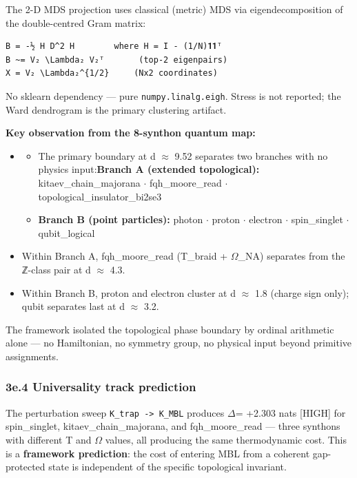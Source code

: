 \documentclass[12pt,a4paper]{article}
\begin{document}
The 2-D MDS projection uses classical (metric) MDS via eigendecomposition of the double-centred Gram matrix:

\begin{lstlisting}
B = -½ H D^2 H        where H = I - (1/N)𝟏𝟏ᵀ
B ~= V₂ \Lambda₂ V₂ᵀ       (top-2 eigenpairs)
X = V₂ \Lambda₂^{1/2}     (Nx2 coordinates)
\end{lstlisting}

No sklearn dependency --- pure \texttt{numpy.linalg.eigh}. Stress is not reported; the Ward dendrogram is the primary clustering artifact.

\textbf{Key observation from the 8-synthon quantum map:}

\begin{itemize}
    \item 
    \begin{itemize}
    \item The primary boundary at d $\approx$ 9.52 separates two branches with no physics input:\textbf{Branch A (extended topological):} kitaev\_chain\_majorana $\cdot$ fqh\_moore\_read $\cdot$ topological\_insulator\_bi2se3
    \item \textbf{Branch B (point particles):} photon $\cdot$ proton $\cdot$ electron $\cdot$ spin\_singlet $\cdot$ qubit\_logical
\end{itemize}

    \item Within Branch A, fqh\_moore\_read (T\_braid + $\Omega$\_NA) separates from the ℤ-class pair at d $\approx$ 4.3.
    \item Within Branch B, proton and electron cluster at d $\approx$ 1.8 (charge sign only); qubit separates last at d $\approx$ 3.2.
\end{itemize}

The framework isolated the topological phase boundary by ordinal arithmetic alone --- no Hamiltonian, no symmetry group, no physical input beyond primitive assignments.

\subsubsection{3e.4 Universality track prediction}

The perturbation sweep \texttt{K\_trap -\textgreater{} K\_MBL} produces $\Delta$\xi = +2.303 nats {[}HIGH{]} for spin\_singlet, kitaev\_chain\_majorana, and fqh\_moore\_read --- three synthons with different T and $\Omega$ values, all producing the same thermodynamic cost. This is a \textbf{framework prediction}: the cost of entering MBL from a coherent gap-protected state is independent of the specific topological invariant.
\end{document}
